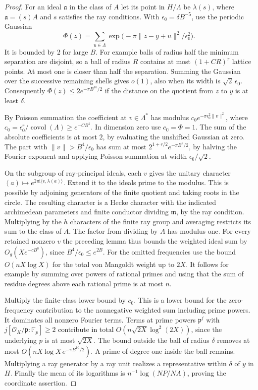 \documentclass[a4paper,11pt]{article}
\theoremstyle{definition}
\theoremstyle{remark}
\numberwithin{equation}{section}
\newcommand{\OO}{\mathcal O}
\begin{document}
\begin{proof}
For an ideal \(\mathfrak a\) in the class of \(A\) let its point
in \(H/\Lambda\) be \(\lambda(s)\), where \(\mathfrak a=(s)A\)
and \(s\) satisfies the ray conditions. With \(\epsilon_0=\delta
B^{-5}\), use the periodic Gaussian
\[
 \Phi(z)=\sum_{u\in\Lambda}
              \exp\bigl(-\pi\|z-y+u\|^2/\epsilon_0^2\bigr).
\]
It is bounded by \(2\) for large \(B\). For example balls of
radius half the minimum separation are disjoint, so a ball of
radius \(R\) contains at most \((1+CR)^r\) lattice points.
At most one is closer than half the separation. Summing the
Gaussian over the successive remaining shells gives \(o(1)\),
also when its width is \(\sqrt2\,\epsilon_0\). Consequently
\(\Phi(z)\le2e^{-\pi B^{10}/2}\) if the distance on the quotient
from \(z\) to \(y\) is at least \(\delta\).

By Poisson summation the coefficient at \(v\in\Lambda^*\) has
modulus \(c_0e^{-\pi\epsilon_0^2\|v\|^2}\), where
\(c_0=\epsilon_0^r/\operatorname{covol}(\Lambda)\ge e^{-C B^2}\).
In dimension zero use \(c_0=\Phi=1\). The sum of the absolute
coefficients is at most \(2\), by evaluating the unshifted Gaussian
at zero. The part with \(\|v\|> B^4/\epsilon_0\) has sum at most
\(2^{1+r/2}e^{-\pi B^8/2}\), by halving the Fourier exponent
and applying Poisson summation at width \(\epsilon_0/\sqrt2\).

On the subgroup of ray-principal ideals, each \(v\) gives the
unitary character \((a)\mapsto e^{2\pi\mathrm i\langle
v,\lambda(a)\rangle}\). Extend it to the ideals prime to the
modulus. This is possible by adjoining generators of the finite
quotient and taking roots in the circle. The resulting character
is a Hecke character with the indicated archimedean parameters
and finite conductor dividing \(\mathfrak m\), by the ray
condition. Multiplying by the \(h\) characters of the finite
ray group and averaging restricts its sum to the class of \(A\).
The factor from dividing by \(A\) has modulus one. For every
retained nonzero \(v\) the preceding lemma thus bounds the
weighted ideal sum by \(O_g(Xe^{-cB^8})\), since
\(B^4/\epsilon_0\le e^{2B}\). For the omitted frequencies use
the bound \(O(nX\log X)\) for the total von Mangoldt weight
up to \(2X\). It follows for example by summing over powers of
rational primes and using that the sum of residue degrees above
each rational prime is at most \(n\).

Multiply the finite-class lower bound by \(c_0\). This is a lower
bound for the zero-frequency contribution to the nonnegative
weighted sum including prime powers. It dominates all nonzero
Fourier terms. Terms at prime powers \(\mathfrak p^j\) with
\(j[\OO_K/\mathfrak p:\mathbb F_p]\ge2\) contribute in total
\(O(n\sqrt{2X}\log^2(2X))\), since the underlying \(p\) is at
most \(\sqrt{2X}\). The bound outside the ball of radius \(\delta\)
removes at most \(O(nX\log X\,e^{-\pi B^{10}/2})\). A prime of
degree one inside the ball remains. Multiplying a ray generator
by a ray unit realizes a representative within \(\delta\) of
\(y\) in \(H\). Finally the mean of its logarithms is
\(n^{-1}\log(NP/NA)\), proving the coordinate assertion.
\end{proof}
\end{document}

